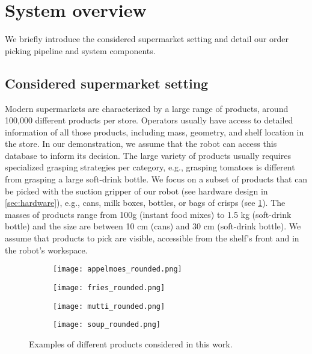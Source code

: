 \section{System overview}

We briefly introduce the considered supermarket setting and
detail our order picking pipeline and system components.

\subsection{Considered supermarket setting}

Modern supermarkets are characterized by a large range of
products, around 100,000 different products per store.
Operators usually have access to detailed information of all
those products, including mass, geometry, and shelf location
in the store. In our demonstration, we assume that the robot
can access this database to inform its decision. The large
variety of products usually requires specialized grasping
strategies per category, e.g., grasping tomatoes is
different from grasping a large soft\hyp{}drink bottle. We focus
on a subset of products that can be picked with the suction
gripper of our robot (see hardware design in
\cref{sec:hardware}), e.g., cans, milk boxes, bottles, or
bags of crisps (see \cref{fig:product_examples}). The masses
of products range from 100g (instant food mixes) to 1.5 kg
(soft\hyp{}drink bottle) and the size are between 10 cm (cans)
and 30 cm (soft\hyp{}drink bottle). We assume that products to
pick are visible, accessible from the shelf's front and in the robot's workspace.
\begin{figure}[t]
  \centering
  \begin{subfigure}[b]{0.20\linewidth}
    \centering
    \texttt{[image: appelmoes\_rounded.png]}
  \end{subfigure}%
  \begin{subfigure}[b]{0.20\linewidth}
    \centering
    \texttt{[image: fries\_rounded.png]}
  \end{subfigure}%
  \begin{subfigure}[b]{0.20\linewidth}
    \centering
    \texttt{[image: mutti\_rounded.png]}
  \end{subfigure}%
  \begin{subfigure}[b]{0.20\linewidth}
    \centering
    \texttt{[image: soup\_rounded.png]}
  \end{subfigure}%
  \caption{Examples of different products considered in this
  work.}
  \label{fig:product_examples}
\end{figure}

